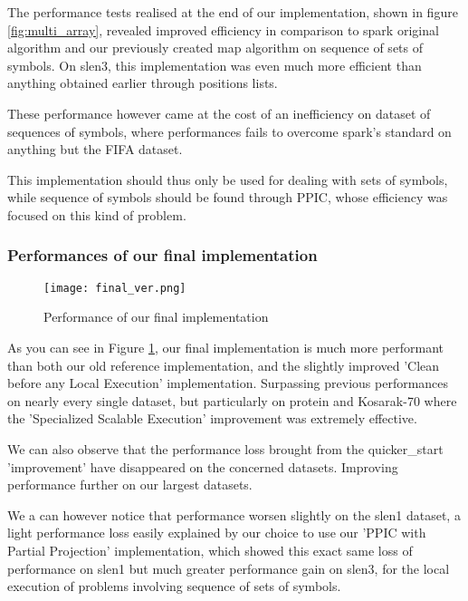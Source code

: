 \documentclass{eplmastersthesis}
\begin{document}
The performance tests realised at the end of our implementation, shown in figure \ref{fig:multi_array}, revealed improved efficiency in comparison to spark original algorithm and our previously created map algorithm on sequence of sets of symbols. On slen3, this implementation was even much more efficient than anything obtained earlier through positions lists. \newline

These performance however came at the cost of an inefficiency on dataset of sequences of symbols, where performances fails to overcome spark's standard on anything but the FIFA dataset. \newline

This implementation should thus only be used for dealing with sets of symbols, while sequence of symbols should be found through PPIC, whose efficiency was focused on this kind of problem.

\subsubsection{Performances of our final implementation}

\begin{figure}[h]
  \centering
  \texttt{[image: final\_ver.png]}
  \caption{Performance of our final implementation}
  \label{fig:final_ver}
\end{figure}

As you can see in Figure \ref{fig:final_ver}, our final implementation is much more performant than both our old reference implementation, and the slightly improved 'Clean before any Local Execution' implementation. Surpassing previous performances on nearly every single dataset, but particularly on protein and Kosarak-70 where the 'Specialized Scalable Execution' improvement was extremely effective. \newline

We can also observe that the performance loss brought from the quicker\_start 'improvement' have disappeared on the concerned datasets. Improving performance further on our largest datasets. \newline

We a can however notice that performance worsen slightly on the slen1 dataset, a light performance loss easily explained by our choice to use our 'PPIC with Partial Projection' implementation, which showed this exact same loss of performance on slen1 but much greater performance gain on slen3, for the local execution of problems involving sequence of sets of symbols. \newline
\end{document}
